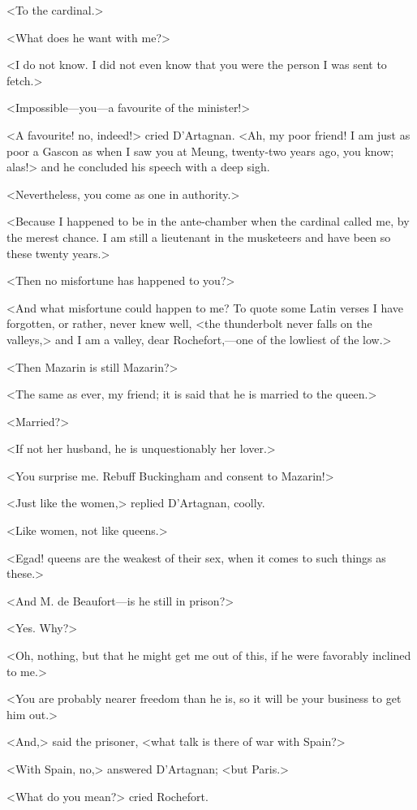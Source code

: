 <To the cardinal.>

<What does he want with me?>

<I do not know. I did not even know that you were the person I was sent to fetch.>

<Impossible—you—a favourite of the minister!>

<A favourite! no, indeed!> cried D'Artagnan. <Ah, my poor friend! I am just as poor a Gascon as when I saw you at Meung, twenty-two years ago, you know; alas!> and he concluded his speech with a deep sigh.

<Nevertheless, you come as one in authority.>

<Because I happened to be in the ante-chamber when the cardinal called me, by the merest chance. I am still a lieutenant in the musketeers and have been so these twenty years.>

<Then no misfortune has happened to you?>

<And what misfortune could happen to me? To quote some Latin verses I have forgotten, or rather, never knew well, <the thunderbolt never falls on the valleys,> and I am a valley, dear Rochefort,—one of the lowliest of the low.>

<Then Mazarin is still Mazarin?>

<The same as ever, my friend; it is said that he is married to the queen.>

<Married?>

<If not her husband, he is unquestionably her lover.>

<You surprise me. Rebuff Buckingham and consent to Mazarin!>

<Just like the women,> replied D'Artagnan, coolly.

<Like women, not like queens.>

<Egad! queens are the weakest of their sex, when it comes to such things as these.>

<And M. de Beaufort—is he still in prison?>

<Yes. Why?>

<Oh, nothing, but that he might get me out of this, if he were favorably inclined to me.>

<You are probably nearer freedom than he is, so it will be your business to get him out.>

<And,> said the prisoner, <what talk is there of war with Spain?>

<With Spain, no,> answered D'Artagnan; <but Paris.>

<What do you mean?> cried Rochefort.

